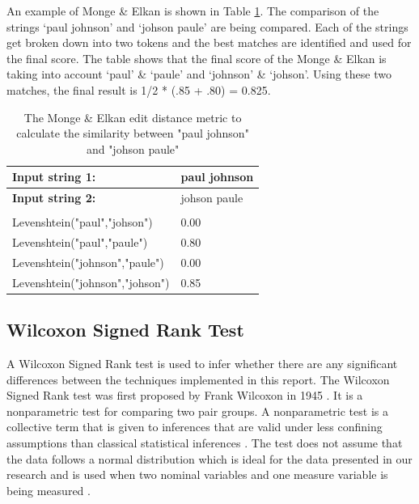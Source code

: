 \documentclass[11pt
              , a4paper
              , twoside
              , openright
              ]{report}
\begin{document}
An example of Monge \& Elkan is shown in Table \ref{mongeTable}. The comparison of the strings `paul johnson' and `johson paule' are being compared. Each of the strings get broken down into two tokens and the best matches are identified and used for the final score. The table shows that the final score of the Monge \& Elkan is taking into account `paul' \& `paule' and `johnson' \& `johson'. Using these two matches, the final result is 1/2 * (.85 + .80) = 0.825.

\begin{table}[H]
\centering

\begin{tabular}{|l|l|}
\hline
\textbf{Input string 1:}        & paul johnson \\ \hline
\textbf{Input string 2:}        & johson paule \\ \hline
                                &              \\ \hline
Levenshtein("paul","johson")    & 0.00         \\ \hline
Levenshtein("paul","paule")     & 0.80         \\ \hline
Levenshtein("johnson","paule")  & 0.00         \\ \hline
Levenshtein("johnson","johson") & 0.85         \\ \hline
\end{tabular}
\caption{The Monge \& Elkan edit distance metric to calculate the similarity between "paul johnson" and "johson paule"}
\label{mongeTable}
\end{table}



\subsection{Wilcoxon Signed Rank Test}

A Wilcoxon Signed Rank test is used to infer whether there are any significant differences between the techniques implemented in this report. The Wilcoxon Signed Rank test was first proposed by Frank Wilcoxon in 1945 \cite{wilcoxon1945individual}. It is a nonparametric test for comparing two pair groups. A nonparametric test is a collective term that is given to inferences that are valid under less confining assumptions than classical statistical inferences \cite{nonparametric}. The test does not assume that the data follows a normal distribution which is ideal for the data presented in our research and is used when two nominal variables and one measure variable is being measured \cite{mcdonald2009handbook}.
\end{document}
